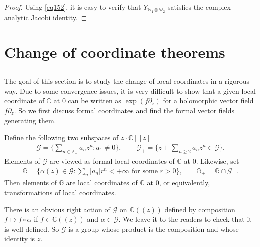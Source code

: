 \documentclass[12pt,a4paper,notitlepage]{article}
\theoremstyle{definition}
\theoremstyle{plain}
\newtheorem{lm}[df]{Lemma}
\newcommand{\mc}{\mathcal}
\newcommand{\Res}{\mathrm{Res}}
\newcommand{\scr}{\mathscr}
\newcommand{\Wbb}{\mathbb W}
\newcommand{\Gbb}{\mathbb G}
\newcommand{\Cbb}{\mathbb C}
\newcommand{\Zbb}{\mathbb Z}
\numberwithin{equation}{section}
\begin{document}
\begin{proof}
Using \eqref{eq152}, it is easy to verify that $Y_{\Wbb_1\otimes\Wbb_2}$ satisfies the complex analytic Jacobi identity.
\end{proof}





\section{Change of coordinate theorems}

\subsection{}

The goal of this section is to study the change of local coordinates in a rigorous way. Due to some convergence issues, it is very difficult to show that a given local coordinate of $\Cbb$ at $0$ can be written as $\exp(f\partial_z)$ for a holomorphic vector field $f\partial_z$. So we first discuss formal coordinates and find the formal vector fields generating them. 

Define the following two subspaces of $z\cdot \Cbb[[z]]$ \index{G@$\scr G,\scr G_+$}
\begin{gather}
\mc G=\Big\{\sum_{n\in\Zbb_+} a_nz^n:a_1\neq 0\Big\},\qquad \mc G_+=\Big\{z+\sum_{n\geq 2} a_nz^n\in\mc G\Big\}.	
\end{gather}
Elements of $\mc G$ are viewed as formal local coordinates of $\Cbb$ at $0$. Likewise, set \index{G@$\Gbb,\Gbb_+$}
\begin{align}
\Gbb=\Big\{\alpha(z)\in\mc G:\sum_n |a_n|r^n<+\infty\text{ for some }r>0\Big\},\qquad \Gbb_+=\Gbb\cap\mc G_+.
\end{align}
Then elements of $\Gbb$ are local coordinates of $\Cbb$ at $0$, or equivalently, transformations of local coordinates.

There is an obvious right action of $\mc G$ on $\Cbb((z))$ defined by composition $f\mapsto f\circ\alpha$ if $f\in\Cbb((z))$ and $\alpha\in\mc G$. We leave it to the readers to check that it is well-defined. So $\mc G$ is a group whose product is the composition and whose identity is $z$.

\end{document}
